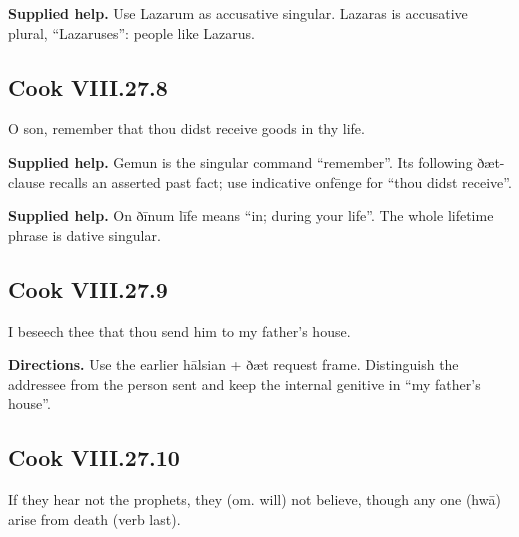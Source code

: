 \textbf{Supplied help.} Use Lazarum as accusative singular. Lazaras is accusative plural, “Lazaruses”: people like Lazarus.

\par\begin{minipage}{\linewidth}\raggedright
\subsection*{Cook VIII.27.8}

O son, remember that thou didst receive goods in thy life.

\end{minipage}\par\addvspace{4pt}

\textbf{Supplied help.} Gemun is the singular command “remember”. Its following ðæt-clause recalls an asserted past fact; use indicative onfēnge for “thou didst receive”.

\textbf{Supplied help.} On ðīnum līfe means “in; during your life”. The whole lifetime phrase is dative singular.

\par\begin{minipage}{\linewidth}\raggedright
\subsection*{Cook VIII.27.9}

I beseech thee that thou send him to my father’s house.

\textbf{Directions.} Use the earlier hālsian + ðæt request frame. Distinguish the addressee from the person sent and keep the internal genitive in “my father’s house”.

\end{minipage}\par\addvspace{4pt}

\par\begin{minipage}{\linewidth}\raggedright
\subsection*{Cook VIII.27.10}

If they hear not the prophets, they (om. will) not believe, though any one (hwā) arise from death (verb last).

\end{minipage}\par\addvspace{4pt}

